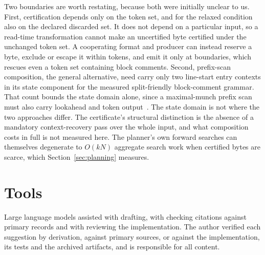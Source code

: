 \documentclass[11pt,a4paper]{article}
\theoremstyle{definition}
\theoremstyle{plain}
\begin{document}
Two boundaries are worth restating, because both were initially unclear to us. First, certification depends only on the
token set, and for the relaxed condition also on the declared discarded set. It does not depend on a particular input,
so a read-time transformation cannot make an uncertified byte certified under the unchanged token set. A cooperating
format and producer can instead reserve a byte, exclude or escape it within tokens, and emit it only at boundaries,
which rescues even a token set containing block comments. Second, prefix-scan composition, the general alternative, need
carry only two line-start entry contexts in its state component for the measured split-friendly block-comment grammar.
That count bounds the state domain alone, since a maximal-munch prefix scan must also carry lookahead and token
output~\cite{yang1996mealy}. The state domain is not where the two approaches differ. The certificate's structural
distinction is the absence of a mandatory context-recovery pass over the whole input, and what composition costs in full
is not measured here. The planner's own forward searches can themselves degenerate to $O(kN)$ aggregate search work when
certified bytes are scarce, which Section~\ref{sec:planning} measures.

\section*{Tools}

Large language models assisted with drafting, with checking citations against primary records and with reviewing the
implementation. The author verified each suggestion by derivation, against primary sources, or against the
implementation, its tests and the archived artifacts, and is responsible for all content.

{\small 

}
\end{document}
